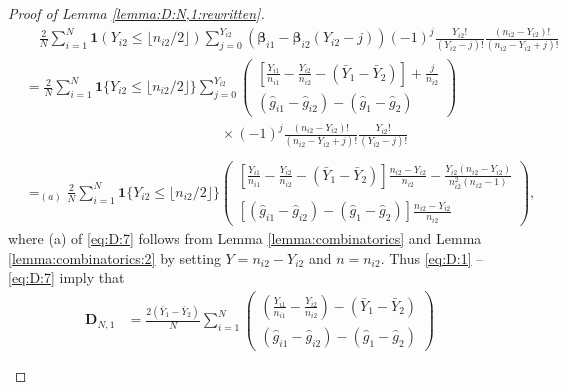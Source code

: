\documentclass[12pt,letterpaper]{article}
\begin{document}
\begin{proof}[Proof of Lemma \ref{lemma:D:N,1:rewritten}]
\begin{equation}\label{eq:D:7}
\begin{array}{rl}
&\quad\displaystyle\frac{2}{N}\sum_{i=1}^N\mathbf{1}(Y_{i2}\leq \lfloor n_{i2}/2\rfloor)\sum_{j=0}^{Y_{i2}}(\boldsymbol{\beta}_{i1}-\boldsymbol{\beta}_{i2}(Y_{i2}-j))(-1)^{j}\frac{Y_{i2}!}{(Y_{i2}-j)!}\frac{(n_{i2} - Y_{i2})!}{(n_{i2}-Y_{i2}+j)!}\\
&\displaystyle=\frac{2}{N}\sum_{i=1}^N\mathbf{1}\{Y_{i2}\leq \lfloor n_{i2}/2\rfloor\}\sum_{j=0}^{Y_{i2}}\begin{pmatrix}
\displaystyle\left[\frac{Y_{i1}}{n_{i1}}-\frac{Y_{i2}}{n_{i2}}-(\bar{Y}_1-\bar{Y}_2)\right]+\frac{j}{n_{i2}}\\
(\hat{g}_{i1}-\hat{g}_{i2})-(\hat{g}_1-\hat{g}_2)
\end{pmatrix}\\
&\quad\quad\quad\quad\quad\quad\quad\quad\quad\quad\quad\quad\quad\quad\displaystyle\times(-1)^{j}\frac{(n_{i2}-Y_{i2})!}{(n_{i2}-Y_{i2}+j)!}\frac{Y_{i2}!}{(Y_{i2}-j)!}\\
\\
&\displaystyle=_{(a)}\frac{2}{N}\sum_{i=1}^N\mathbf{1}\{Y_{i2}\leq \lfloor n_{i2}/2\rfloor\}\begin{pmatrix}
\displaystyle\left[\frac{Y_{i1}}{n_{i1}}-\frac{Y_{i2}}{n_{i2}}-(\bar{Y}_1-\bar{Y}_2)\right]\frac{n_{i2}-Y_{i2}}{n_{i2}}-\frac{Y_{i2}(n_{i2}-Y_{i2})}{n_{i2}^2(n_{i2}-1)}\\
\\
\displaystyle[(\hat{g}_{i1}-\hat{g}_{i2})-(\hat{g}_1-\hat{g}_2)]\frac{n_{i2}-Y_{i2}}{n_{i2}}
\end{pmatrix},
\end{array}
\end{equation}
where (a) of \eqref{eq:D:7} follows from Lemma \ref{lemma:combinatorics} and Lemma \ref{lemma:combinatorics:2} by setting $Y=n_{i2}-Y_{i2}$ and $n=n_{i2}$. 
Thus \eqref{eq:D:1} -- \eqref{eq:D:7} imply that 
\begin{equation}\label{eq:D:N,1:expand}
\begin{array}{rl}
\mathbf{D}_{N,1}\!\!\!\!&\displaystyle=\frac{2(\bar{Y}_1-\bar{Y}_2)}{N}\sum_{i=1}^N\begin{pmatrix}
\displaystyle\left(\frac{Y_{i1}}{n_{i1}}-\frac{Y_{i2}}{n_{i2}}\right)-(\bar{Y}_1-\bar{Y}_2)\\
\displaystyle(\hat{g}_{i1}-\hat{g}_{i2})-(\hat{g}_1-\hat{g}_2)
\end{pmatrix}\\
\\

\end{array}
\end{equation}
\end{proof}
\end{document}
